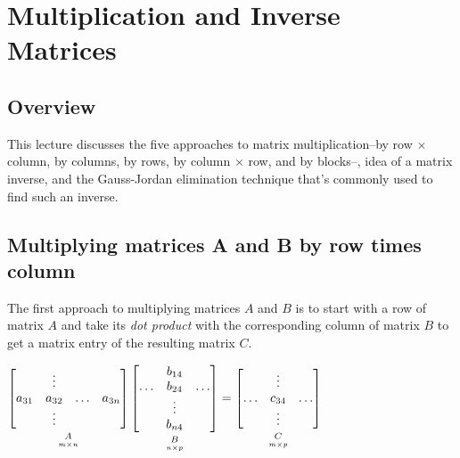 \documentclass[../main.tex]{subfiles}
\begin{document}
\section{Multiplication and Inverse Matrices}


\subsection{Overview}
This lecture discusses the five approaches to matrix multiplication--by row \(\times\) column, by columns, by rows, by column \(\times\) row, and by blocks--, idea of a matrix inverse, and the Gauss-Jordan elimination technique that's commonly used to find such an inverse.


\subsection{Multiplying matrices A and B by row times column}
The first approach to multiplying matrices \(A\) and \(B\) is to start with a row of matrix \(A\) and take its \emph{dot product} with the corresponding column of matrix \(B\) to get a matrix entry of the resulting matrix \(C\).

\begin{adjustbox}{width = \columnwidth}
    \(
    \underbracket[0pt][0pt]{
        \begin{bmatrix}
                   & \vdots &        &        \\
            a_{31} & a_{32} & \ldots & a_{3n} \\
                   & \vdots &        &
        \end{bmatrix}
    }_{\mathstrut \underset{m \times n}{A}}
    \underbracket[0pt][0pt]{
        \begin{bmatrix}
                   & b_{14} &        \\
            \ldots & b_{24} & \ldots \\
                   & \vdots &        \\
                   & b_{n4} &
        \end{bmatrix}
    }_{\mathstrut \underset{n \times p}{B}}
    =
    \underbracket[0pt][0pt]{
        \begin{bmatrix}
                   & \vdots &        \\
            \ldots & c_{34} & \ldots \\
                   & \vdots &
        \end{bmatrix}
    }_{\mathstrut \underset{m \times p}{C}}
    \)
\end{adjustbox}
\end{document}
